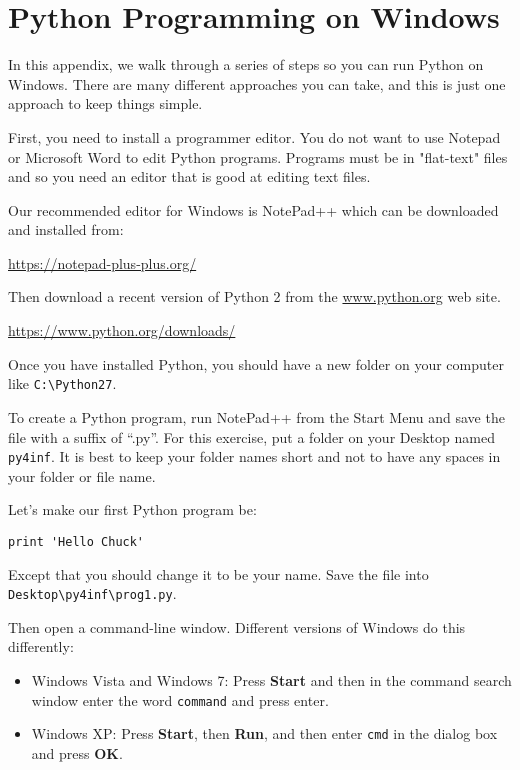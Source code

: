 
\chapter{Python Programming on Windows}

In this appendix, we walk through a series of steps
so you can run Python on Windows.  There are many different 
approaches you can take, and this is just one
approach to keep things simple.

First, you need to install a programmer editor.  You
do not want to use Notepad or Microsoft Word to edit
Python programs.  Programs must be in "flat-text" files
and so you need an editor that is good at
editing text files.

Our recommended editor for Windows is NotePad++ which
can be downloaded and installed from:

\url{https://notepad-plus-plus.org/}

Then download a recent version of Python 2 from the
\url{www.python.org} web site.

\url{https://www.python.org/downloads/}

Once you have installed Python, you should have a new
folder on your computer like {\tt C:{\textbackslash}Python27}.

To create a Python program, run NotePad++ from the Start Menu
and save the file with a suffix of ``.py''.  For this
exercise, put a folder on your Desktop named 
{\tt py4inf}.  It is best to keep your folder names short
and not to have any spaces in your folder or file name.

Let's make our first Python program be:

\beforeverb
\begin{verbatim}
print 'Hello Chuck'
\end{verbatim}
\afterverb
%
Except that you should change it to be your name.  Save the file
into {\tt Desktop{\textbackslash}py4inf{\textbackslash}prog1.py}.

Then open a command-line window.  Different versions of Windows
do this differently:

\begin{itemize}
\item Windows Vista and Windows 7: Press {\bf Start}
and then in the command search window enter the word
{\tt command} and press enter.

\item Windows XP: Press {\bf Start}, then {\bf Run}, and 
then enter {\tt cmd} in the dialog box and press {\bf OK}.
\end{itemize}


